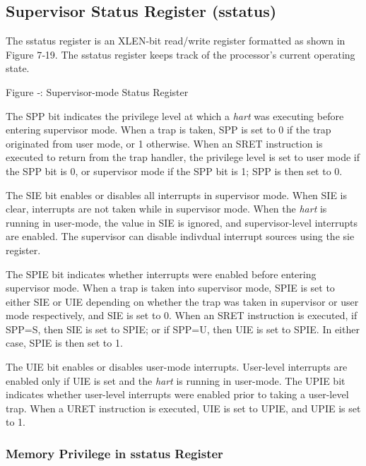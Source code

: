 \subsection{Supervisor Status Register (sstatus)
}\label{supervisor-status-register-sstatus}

The sstatus register is an XLEN-bit read/write register formatted as
shown in Figure 7‑19. The sstatus register keeps track of the
processor's current operating state.

\missingfigure{}

\protect\hypertarget{_Ref367096223}{}{}Figure ‑: Supervisor-mode Status
Register

The SPP bit indicates the privilege level at which a \emph{hart} was
executing before entering supervisor mode. When a trap is taken, SPP is
set to 0 if the trap originated from user mode, or 1 otherwise. When an
SRET instruction is executed to return from the trap handler, the
privilege level is set to user mode if the SPP bit is 0, or supervisor
mode if the SPP bit is 1; SPP is then set to 0.

The SIE bit enables or disables all interrupts in supervisor mode. When
SIE is clear, interrupts are not taken while in supervisor mode. When
the \emph{hart} is running in user-mode, the value in SIE is ignored,
and supervisor-level interrupts are enabled. The supervisor can disable
indivdual interrupt sources using the sie register.

The SPIE bit indicates whether interrupts were enabled before entering
supervisor mode. When a trap is taken into supervisor mode, SPIE is set
to either SIE or UIE depending on whether the trap was taken in
supervisor or user mode respectively, and SIE is set to 0. When an SRET
instruction is executed, if SPP=S, then SIE is set to SPIE; or if SPP=U,
then UIE is set to SPIE. In either case, SPIE is then set to 1.

The UIE bit enables or disables user-mode interrupts. User-level
interrupts are enabled only if UIE is set and the \emph{hart} is running
in user-mode. The UPIE bit indicates whether user-level interrupts were
enabled prior to taking a user-level trap. When a URET instruction is
executed, UIE is set to UPIE, and UPIE is set to 1.

\subsubsection{Memory Privilege in sstatus Register
}\label{memory-privilege-in-sstatus-register}

